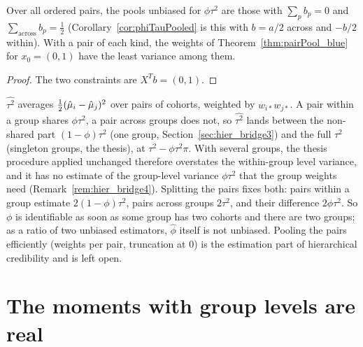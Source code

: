 \begin{corollary}\label{cor:phiTauPool_blue}
  \leanok
  Over all ordered pairs, the pools unbiased for $\phi\tau^2$ are those with $\sum_p b_p = 0$ and
  $\sum_{\mathrm{across}} b_p = \tfrac12$ (Corollary~\ref{cor:phiTauPooled} is this with
  $b = a/2$ across and $-b/2$ within). With a pair of each kind, the weights of
  Theorem~\ref{thm:pairPool_blue} for $x_0 = (0, 1)$ have the least variance among them.
\end{corollary}
\begin{proof}
  \leanok
  The two constraints are $X^Tb = (0, 1)$.
\end{proof}

\begin{remark}\label{rem:hier_bridge5}
  $\widehat{\tau^2}$ averages $\tfrac12(\hat\mu_i - \hat\mu_j)^2$ over pairs of
  cohorts, weighted by $w_{i*}w_{j*}$. A pair within a group shares $\phi\tau^2$,
  a pair across groups does not, so $\widehat{\tau^2}$ lands between the
  non-shared part $(1-\phi)\tau^2$ (one group, Section~\ref{sec:hier_bridge3})
  and the full $\tau^2$ (singleton groups, the thesis), at $\tau^2 - \phi\tau^2\pi$.
  With several groups, the thesis procedure applied unchanged therefore
  overstates the within-group level variance, and it has no estimate of the
  group-level variance $\phi\tau^2$ that the group weights need
  (Remark~\ref{rem:hier_bridge4}). Splitting the pairs fixes both: pairs within
  a group estimate $2(1-\phi)\tau^2$, pairs across groups $2\tau^2$, and their
  difference $2\phi\tau^2$. So $\phi$ is identifiable as soon as some group
  has two cohorts and there are two groups; as a ratio of two unbiased
  estimators, $\hat\phi$ itself is not unbiased. Pooling the pairs efficiently
  (weights per pair, truncation at $0$) is the estimation part of hierarchical
  credibility and is left open.
\end{remark}

\section{The moments with group levels are real}\label{sec:hier_moments}

